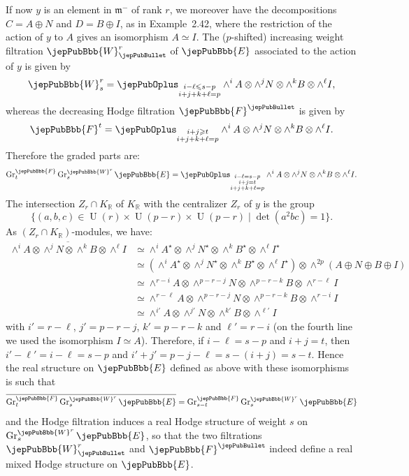 \begin{example}
If now $y$ is an element in $\mathfrak m^-$ of rank $r$, we moreover have the decompositions $C=A\oplus N$ and $D=B\oplus I$, as in Example~2.42, where the restriction of the action of $y$ to $A$ gives an isomorphism $A\simeq I$. The ($p$-shifted) increasing weight filtration $\jepPubBbb{W}^r_\jepPubBullet$ of $\jepPubBbb{E}$ associated to the action of $y$ is given by
\[
\jepPubBbb{W}^r_s=\jepPubOplus_{\substack{i-\ell\leqslant s-p\\i+j+k+\ell=p}}\wedge^i A\otimes\wedge^j N\otimes\wedge^k B\otimes\wedge^\ell I,
\]
whereas the decreasing Hodge filtration $\jepPubBbb{F}^\jepPubBullet$ is given by
\[
\jepPubBbb{F}^t=\jepPubOplus_{\substack{i+j\geqslant t\\i+j+k+\ell=p}}\wedge^i A\otimes\wedge^j N\otimes\wedge^k B\otimes\wedge^\ell I.
\]
Therefore the graded parts are:
\[
\operatorname{Gr}^{\jepPubBbb{F}}_t\operatorname{Gr}^{\jepPubBbb{W}^r}_s\jepPubBbb{E}=\jepPubOplus_{\substack{i-\ell=s-p\\i+j=t\\i+j+k+\ell=p}}\wedge^i A\otimes\wedge^j N\otimes\wedge^k B\otimes\wedge^\ell I.
\]
The intersection $Z_r\cap K_{\mathbb R}$ of $K_{\mathbb R}$ with the centralizer $Z_r$ of $y$ is the group
\[
\{(a,b,c)\in\operatorname U(r)\times\operatorname U(p-r)\times\operatorname U(p-r)\mid\det(a^2bc)=1\}.
\]
As $(Z_r\cap K_{\mathbb R})$-modules, we have:
\begin{align*}
\overline{\wedge^i A\otimes\wedge^j N\otimes\wedge^k B\otimes\wedge^\ell I}&\simeq\wedge^i A^\star\otimes\wedge^j N^\star\otimes\wedge^k B^\star\otimes\wedge^\ell I^\star\\
&\simeq(\wedge^i A^\star\otimes\wedge^j N^\star\otimes\wedge^k B^\star\otimes\wedge^\ell I^\star)\otimes\wedge^{2p}(A\oplus N\oplus B\oplus I)\\
&\simeq\wedge^{r-i}A\otimes\wedge^{p-r-j}N\otimes\wedge^{p-r-k}B\otimes\wedge^{r-\ell}I\\
&\simeq\wedge^{r-\ell}A\otimes\wedge^{p-r-j}N\otimes\wedge^{p-r-k}B\otimes\wedge^{r-i}I\\
&\simeq\wedge^{i'}A\otimes\wedge^{j'}N\otimes\wedge^{k'}B\otimes\wedge^{\ell'}I
\end{align*}
with $i'=r-\ell$, $j'=p-r-j$, $k'=p-r-k$ and $\ell'=r-i$ (on the fourth line we used the isomorphism $I\simeq A$). Therefore, if $i-\ell=s-p$ and $i+j=t$, then $i'-\ell'=i-\ell=s-p$ and $i'+j'=p-j-\ell=s-(i+j)=s-t$. Hence the real structure on $\jepPubBbb{E}$ defined as above with these isomorphisms is such that
\[
\overline{\operatorname{Gr}^{\jepPubBbb{F}}_t\operatorname{Gr}^{\jepPubBbb{W}^r}_s\jepPubBbb{E}}=\operatorname{Gr}^{\jepPubBbb{F}}_{s-t}\operatorname{Gr}^{\jepPubBbb{W}^r}_s\jepPubBbb{E}
\]
and the Hodge filtration induces a real Hodge structure of weight $s$ on $\operatorname{Gr}^{\jepPubBbb{W}^r}_s\jepPubBbb{E}$, so that the two filtrations $\jepPubBbb{W}^r_\jepPubBullet$ and $\jepPubBbb{F}^\jepPubBullet$ indeed define a real mixed Hodge structure on $\jepPubBbb{E}$.
\end{example}
